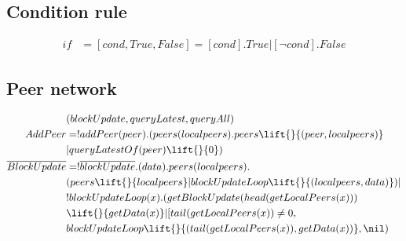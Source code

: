 \subsection{Condition rule}

\begin{align*}
    if &= [cond,True,False] = [cond].True|[\neg cond].False
\end{align*}

\subsection{Peer network}

\begin{align*}
    &(blockUpdate, queryLatest, queryAll)\\
    AddPeer &= !addPeer(peer).(peers(localpeers).peers\lift{}{(peer,localpeers)}\\
        &|queryLatestOf(peer)\lift{}{0})\\
    \overline{BlockUpdate} &= !\overline{blockUpdate}.(data).peers(localpeers).\\
        &(peers\lift{}{localpeers}|blockUpdateLoop\lift{}{(localpeers,data)})|\\
        &!blockUpdateLoop(x).(getBlockUpdate(head(getLocalPeers(x)))\\
        &\lift{}{getData(x)}|[tail(getLocalPeers(x))\not= 0,\\
        &blockUpdateLoop\lift{}{(tail(getLocalPeers(x)),getData(x))},\nil)
\end{align*}